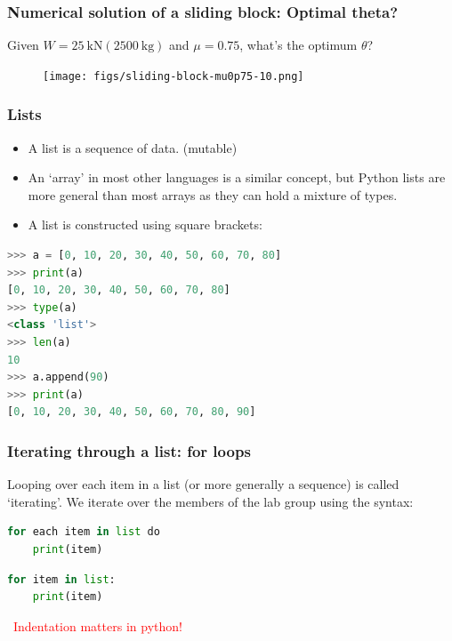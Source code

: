 \documentclass[notes]{beamer}
\begin{document}
\begin{frame}
	\frametitle{\faCommentsO Numerical solution of a sliding block: Optimal theta?}
	Given $W = \SI{25}{\kilo\newton} (\SI{2500}{\kilogram})$ and $\mu = 0.75$, what's the optimum $\theta$?
	\begin{figure}[ht]
		\centering
		\texttt{[image: figs/sliding-block-mu0p75-10.png]}
	\end{figure}
\end{frame}

\begin{frame}[fragile]
	\frametitle{Lists}
	\begin{itemize}
		\item A list is a sequence of data. (mutable)
		\item An `array' in most other languages is a similar concept, but Python lists are more general than most arrays as they can hold a mixture of types. 
		\item A list is constructed using square brackets:
	\end{itemize}
	\begin{lstlisting}[language=Python]
>>> a = [0, 10, 20, 30, 40, 50, 60, 70, 80]
>>> print(a)
[0, 10, 20, 30, 40, 50, 60, 70, 80]
>>> type(a)
<class 'list'>
>>> len(a)
10
>>> a.append(90)
>>> print(a)
[0, 10, 20, 30, 40, 50, 60, 70, 80, 90]
	\end{lstlisting}
\end{frame}


\begin{frame}[fragile]
	\frametitle{Iterating through a list: for loops}
	
	Looping over each item in a list (or more generally a sequence) is called `iterating'. We iterate over the members of the lab group using the syntax:

	\begin{lstlisting}[language=Python]
for each item in list do
	print(item)
	\end{lstlisting}
	
	\begin{lstlisting}[language=Python]
for item in list:
	print(item)
	\end{lstlisting}
	
	\textcolor{red}{\faWarning ~Indentation matters in python!}
\end{frame}

\end{document}
